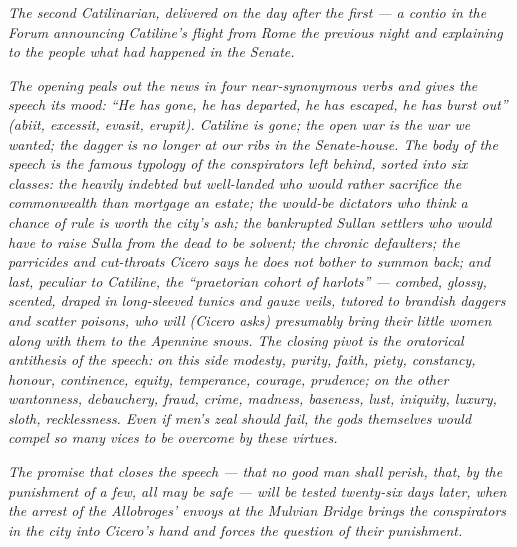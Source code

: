 
\textit{The second Catilinarian, delivered on the day after
the first --- a \textit{contio} in the Forum announcing
Catiline's flight from Rome the previous night and explaining
to the people what had happened in the Senate.}

\textit{The opening peals out the news in four near-synonymous
verbs and gives the speech its mood: ``He has gone, he has
departed, he has escaped, he has burst out''
(\textit{abiit, excessit, evasit, erupit}). Catiline is gone;
the open war is the war we wanted; the dagger is no longer at
our ribs in the Senate-house. The body of the speech is the
famous typology of the conspirators left behind, sorted into
six classes: the heavily indebted but well-landed who would
rather sacrifice the commonwealth than mortgage an estate;
the would-be dictators who think a chance of rule is worth
the city's ash; the bankrupted Sullan settlers who would have
to raise Sulla from the dead to be solvent; the chronic
defaulters; the parricides and cut-throats Cicero says he
does not bother to summon back; and last, peculiar to
Catiline, the ``praetorian cohort of harlots'' --- combed,
glossy, scented, draped in long-sleeved tunics and gauze
veils, tutored to brandish daggers and scatter poisons, who
will (Cicero asks) presumably bring their little women along
with them to the Apennine snows. The closing pivot is the
oratorical antithesis of the speech: on this side modesty,
purity, faith, piety, constancy, honour, continence, equity,
temperance, courage, prudence; on the other wantonness,
debauchery, fraud, crime, madness, baseness, lust, iniquity,
luxury, sloth, recklessness. Even if men's zeal should fail,
the gods themselves would compel so many vices to be overcome
by these virtues.}

\textit{The promise that closes the speech --- that no good
man shall perish, that, by the punishment of a few, all may
be safe --- will be tested twenty-six days later, when the
arrest of the Allobroges' envoys at the Mulvian Bridge brings
the conspirators in the city into Cicero's hand and forces
the question of their punishment.}
